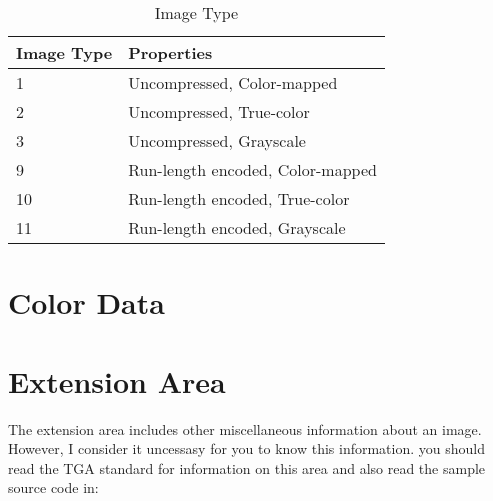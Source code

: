\begin{refsection}
  \begin{table}[h!]
    \centering
    \begin{tabular}[h!]{ll}
      \toprule
      Image Type & Properties \\
      \midrule
      1 & Uncompressed, Color-mapped \\
      2 & Uncompressed, True-color \\
      3 & Uncompressed, Grayscale\\
      9 & Run-length encoded, Color-mapped \\
      10 & Run-length encoded, True-color \\
      11 & Run-length encoded, Grayscale\\
      \bottomrule
    \end{tabular}
    \caption{Image Type}
    \label{tab:imgtype}
  \end{table}


  \section{Color Data}

  \section{Extension Area}

  The extension area includes other miscellaneous information about an
  image. However, I consider it uncessasy for you to know this
  information. you should read the TGA standard for information on
  this area and also read the sample source code in:

  \printbibliography[heading=subbibliography]

\end{refsection}